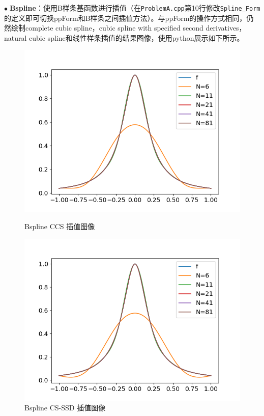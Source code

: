 \documentclass{ctexart}
\begin{document}
\begin{sloppypar}
$\bullet \;$\textbf{Bspline}：使用B样条基函数进行插值（在\verb|ProblemA.cpp|第10行修改\verb|Spline_Form|的定义即可切换ppForm和B样条之间插值方法）。与ppForm的操作方式相同，仍然绘制complete cubic spline，cubic spline with specified second derivatives，natural cubic spline和线性样条插值的结果图像，使用python展示如下所示。
\begin{figure}[H]
  \begin{minipage}[t]{0.5\linewidth}
    \centering
    \includegraphics[scale = 0.45]{fig//ProblemA_Bspline_13.png}
    \caption{Bspline CCS 插值图像}
  \end{minipage}
  \begin{minipage}[t]{0.5\linewidth}
    \centering
    \includegraphics[scale = 0.45]{fig//ProblemA_Bspline_23.png}
    \caption{Bspline CS-SSD 插值图像}
  \end{minipage}
  \label{fig4}
\end{figure}


\end{sloppypar}
\end{document}

